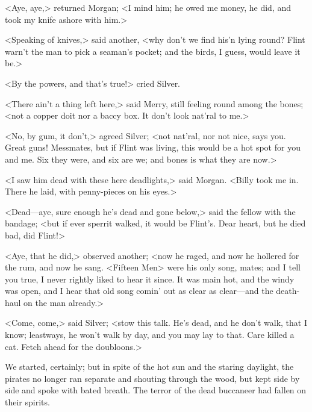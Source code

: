 <Aye, aye,> returned Morgan; <I mind him; he owed me money, he did, and took my knife ashore with him.>

<Speaking of knives,> said another, <why don't we find his'n lying round? Flint warn't the man to pick a seaman's pocket; and the birds, I guess, would leave it be.>

<By the powers, and that's true!> cried Silver.

<There ain't a thing left here,> said Merry, still feeling round among the bones; <not a copper doit nor a baccy box. It don't look nat'ral to me.>

<No, by gum, it don't,> agreed Silver; <not nat'ral, nor not nice, says you. Great guns! Messmates, but if Flint was living, this would be a hot spot for you and me. Six they were, and six are we; and bones is what they are now.>

<I saw him dead with these here deadlights,> said Morgan. <Billy took me in. There he laid, with penny-pieces on his eyes.>

<Dead—aye, sure enough he's dead and gone below,> said the fellow with the bandage; <but if ever sperrit walked, it would be Flint's. Dear heart, but he died bad, did Flint!>

<Aye, that he did,> observed another; <now he raged, and now he hollered for the rum, and now he sang. <Fifteen Men> were his only song, mates; and I tell you true, I never rightly liked to hear it since. It was main hot, and the windy was open, and I hear that old song comin' out as clear as clear—and the death-haul on the man already.>

<Come, come,> said Silver; <stow this talk. He's dead, and he don't walk, that I know; leastways, he won't walk by day, and you may lay to that. Care killed a cat. Fetch ahead for the doubloons.>

We started, certainly; but in spite of the hot sun and the staring daylight, the pirates no longer ran separate and shouting through the wood, but kept side by side and spoke with bated breath. The terror of the dead buccaneer had fallen on their spirits.